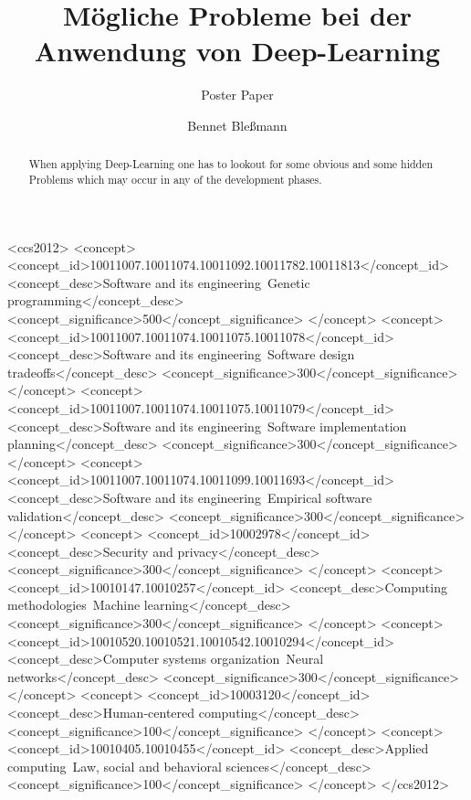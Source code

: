 \documentclass[sigconf,nonacm,natbib=false]{acmart}
\begin{document}
%
\title{Mögliche Probleme bei
der Anwendung von
Deep-Learning}
\subtitle{Poster Paper}

%
\author{Bennet Bleßmann}

%
\begin{abstract}
When applying Deep-Learning one has to lookout for some obvious and some hidden 
Problems which may occur in any of the development phases.
\end{abstract}

%
%
\begin{CCSXML}
<ccs2012>
<concept>
<concept_id>10011007.10011074.10011092.10011782.10011813</concept_id>
<concept_desc>Software and its engineering~Genetic programming</concept_desc>
<concept_significance>500</concept_significance>
</concept>
<concept>
<concept_id>10011007.10011074.10011075.10011078</concept_id>
<concept_desc>Software and its engineering~Software design tradeoffs</concept_desc>
<concept_significance>300</concept_significance>
</concept>
<concept>
<concept_id>10011007.10011074.10011075.10011079</concept_id>
<concept_desc>Software and its engineering~Software implementation planning</concept_desc>
<concept_significance>300</concept_significance>
</concept>
<concept>
<concept_id>10011007.10011074.10011099.10011693</concept_id>
<concept_desc>Software and its engineering~Empirical software validation</concept_desc>
<concept_significance>300</concept_significance>
</concept>
<concept>
<concept_id>10002978</concept_id>
<concept_desc>Security and privacy</concept_desc>
<concept_significance>300</concept_significance>
</concept>
<concept>
<concept_id>10010147.10010257</concept_id>
<concept_desc>Computing methodologies~Machine learning</concept_desc>
<concept_significance>300</concept_significance>
</concept>
<concept>
<concept_id>10010520.10010521.10010542.10010294</concept_id>
<concept_desc>Computer systems organization~Neural networks</concept_desc>
<concept_significance>300</concept_significance>
</concept>
<concept>
<concept_id>10003120</concept_id>
<concept_desc>Human-centered computing</concept_desc>
<concept_significance>100</concept_significance>
</concept>
<concept>
<concept_id>10010405.10010455</concept_id>
<concept_desc>Applied computing~Law, social and behavioral sciences</concept_desc>
<concept_significance>100</concept_significance>
</concept>
</ccs2012>
\end{CCSXML}
\end{document}
